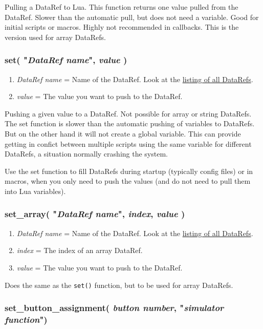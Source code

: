 \documentclass[11pt,parskip=half,a4paper]{scrartcl}
\begin{document}
Pulling a DataRef to Lua. This function returns one value pulled from the DataRef. Slower than the automatic pull, but does not need a variable. Good for initial scripts or macros. Highly not recommended in callbacks. This is the version used for array DataRefs.

\newpage
\subsubsection{set( "\emph{DataRef name}", \emph{value} )}

\begin{enumerate}
	\item \emph{DataRef name} = Name of the DataRef. Look at the \href{http://www.xsquawkbox.net/xpsdk/docs/DataRefs.html}{listing of all DataRefs}.
	\item \emph{value} = The value you want to push to the DataRef.
\end{enumerate}

Pushing a given value to a DataRef. Not possible for array or string DataRefs. The set function is slower than the automatic pushing of variables to DataRefs. But on the other hand it will not create a global variable. This can provide getting in confict between multiple scripts using the same variable for different DataRefs, a situation normally crashing the system.

Use the set function to fill DataRefs during startup (typically config files) or in macros, when you only need to push the values (and do not need to pull them into Lua variables).

\subsubsection{set\_array( "\emph{DataRef name}", \emph{index}, \emph{value} )}

\begin{enumerate}
	\item \emph{DataRef name} = Name of the DataRef. Look at the \href{http://www.xsquawkbox.net/xpsdk/docs/DataRefs.html}{listing of all DataRefs}.
	\item \emph{index} = The index of an array DataRef.
	\item \emph{value} = The value you want to push to the DataRef.
\end{enumerate}

Does the same as the \verb|set()| function, but to be used for array DataRefs.

\subsubsection{set\_button\_assignment( \emph{button number}, "\emph{simulator function}")}
\end{document}
